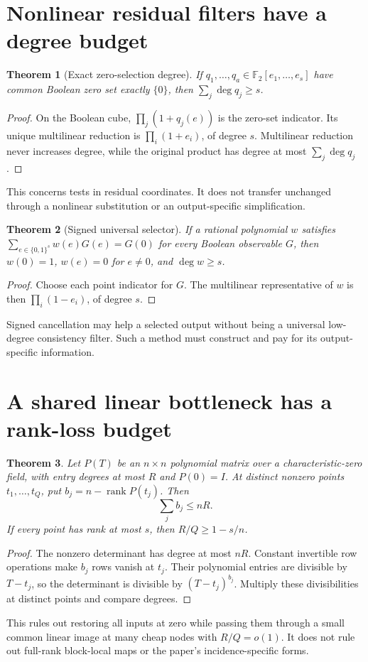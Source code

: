 \documentclass[11pt]{article}
\newtheorem{theorem}{Theorem}
\begin{document}
\section{Nonlinear residual filters have a degree budget}
\begin{theorem}[Exact zero-selection degree]
If $q_1,\ldots,q_a\in\mathbb F_2[e_1,\ldots,e_s]$ have common Boolean
zero set exactly $\{0\}$, then $\sum_j\deg q_j\ge s$.
\end{theorem}
\begin{proof}
On the Boolean cube, $\prod_j(1+q_j(e))$ is the zero-set indicator.
Its unique multilinear reduction is $\prod_i(1+e_i)$, of degree $s$.
Multilinear reduction never increases degree, while the original product has
degree at most $\sum_j\deg q_j$.
\end{proof}
This concerns tests in residual coordinates. It does not transfer unchanged
through a nonlinear substitution or an output-specific simplification.

\begin{theorem}[Signed universal selector]
If a rational polynomial $w$ satisfies
$\sum_{e\in\{0,1\}^s}w(e)G(e)=G(0)$ for every Boolean observable $G$,
then $w(0)=1$, $w(e)=0$ for $e\ne0$, and $\deg w\ge s$.
\end{theorem}
\begin{proof}
Choose each point indicator for $G$. The multilinear representative of $w$
is then $\prod_i(1-e_i)$, of degree $s$.
\end{proof}
Signed cancellation may help a selected output without being a universal
low-degree consistency filter. Such a method must construct and pay for its
output-specific information.

\section{A shared linear bottleneck has a rank-loss budget}
\begin{theorem}
Let $P(T)$ be an $n\times n$ polynomial matrix over a characteristic-zero
field, with entry degrees at most $R$ and $P(0)=I$. At distinct nonzero
points $t_1,\ldots,t_Q$, put $b_j=n-\operatorname{rank}P(t_j)$. Then
\[
 \sum_j b_j\le nR.
\]
If every point has rank at most $s$, then $R/Q\ge1-s/n$.
\end{theorem}
\begin{proof}
The nonzero determinant has degree at most $nR$. Constant invertible row
operations make $b_j$ rows vanish at $t_j$. Their polynomial entries are
divisible by $T-t_j$, so the determinant is divisible by $(T-t_j)^{b_j}$.
Multiply these divisibilities at distinct points and compare degrees.
\end{proof}
This rules out restoring all inputs at zero while passing them through a
small common linear image at many cheap nodes with $R/Q=o(1)$. It does not
rule out full-rank block-local maps or the paper's incidence-specific forms.
\end{document}
